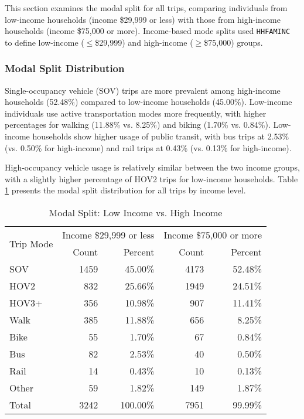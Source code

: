 This section examines the modal split for all trips, comparing individuals from low-income households (income \$29,999 or less) with those from high-income households (income \$75,000 or more). Income-based mode splits used \texttt{HHFAMINC} to define low-income ($\leq$\$29,999) and high-income ($\geq$\$75,000) groups.

\subsubsection{Modal Split Distribution}

Single-occupancy vehicle (SOV) trips are more prevalent among high-income households (52.48\%) compared to low-income households (45.00\%). Low-income individuals use active transportation modes more frequently, with higher percentages for walking (11.88\% vs. 8.25\%) and biking (1.70\% vs. 0.84\%). Low-income households show higher usage of public transit, with bus trips at 2.53\% (vs. 0.50\% for high-income) and rail trips at 0.43\% (vs. 0.13\% for high-income). 

High-occupancy vehicle usage is relatively similar between the two income groups, with a slightly higher percentage of HOV2 trips for low-income households. Table \ref{tab:modal_split_income} presents the modal split distribution for all trips by income level. 

\begin{table}[htbp]
\centering
\caption{Modal Split: Low Income vs. High Income}
\label{tab:modal_split_income}
\begin{tabular}{lrrrr}
\toprule
\multirow{2}{*}{Trip Mode} & \multicolumn{2}{c}{Income \$29,999 or less} & \multicolumn{2}{c}{Income \$75,000 or more} \\
\cmidrule(lr){2-3} \cmidrule(lr){4-5}
 & Count & Percent & Count & Percent \\
\midrule
SOV & 1459 & 45.00\% & 4173 & 52.48\% \\
HOV2 & 832 & 25.66\% & 1949 & 24.51\% \\
HOV3+ & 356 & 10.98\% & 907 & 11.41\% \\
Walk & 385 & 11.88\% & 656 & 8.25\% \\
Bike & 55 & 1.70\% & 67 & 0.84\% \\
Bus & 82 & 2.53\% & 40 & 0.50\% \\
Rail & 14 & 0.43\% & 10 & 0.13\% \\
Other & 59 & 1.82\% & 149 & 1.87\% \\
\midrule
Total & 3242 & 100.00\% & 7951 & 99.99\% \\
\bottomrule
\end{tabular}
\end{table}

